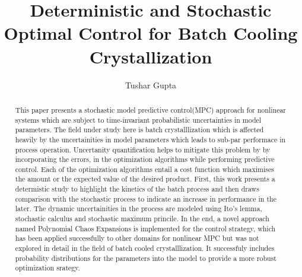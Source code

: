\documentclass[3p,times,authoryear]{elsarticle}
\begin{document}
\begin{frontmatter}



\dochead{}

\title{Deterministic and Stochastic Optimal Control for Batch Cooling Crystallization}


\author{Tushar Gupta}

\address{}

\begin{abstract}
This paper presents a stochastic model predictive control(MPC) approach for nonlinear systems which are subject to time-invariant probabilistic uncertainties in model parameters. The field under study here is batch crystalllization which is affected heavily by the uncertainities in model parameters which leads to sub-par performace in process operation. Uncertanity quantification helps to mitigate this problem by by incorporating the errors, in the optimization algorithms while performing predictive control. Each of the optimization algorithms entail a cost function which maximises the amount or the expected value of the desired product. First, this work presents a determistic study to highlight the kinetics of the batch process and then draws comparison with the stochastic process to indicate an increase in performance in the later. The dynamic uncertainities in the process are modeled using Ito's lemma, stochastic calculus and stochastic maximum princile. In the end, a novel approach named Polynomial Chaos Expansions is implemented for the control strategy, which has been applied successfully to other domains for nonlinear MPC but was not explored in detail in the field of batch cooled crystalllization. It successfuly includes probability distributions for the parameters into the model to provide a more robust optimization srategy. 


\end{abstract}
\end{frontmatter}
\end{document}
